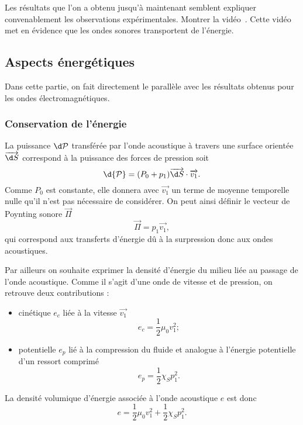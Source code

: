 \begin{transition}
Les résultats que l'on a obtenu jusqu'à maintenant semblent expliquer convenablement les observations expérimentales.
Montrer la vidéo~\cite{Metzdorff2017}.
Cette vidéo met en évidence que les ondes sonores transportent de l'énergie.
\end{transition}

\subsection{Aspects énergétiques}

Dans cette partie, on fait directement le parallèle avec les résultats obtenus pour les ondes électromagnétiques.

\subsubsection{Conservation de l'énergie}

La puissance $\d\cal{P}$ transférée par l'onde acoustique à travers une surface orientée $\overrightarrow{\d S}$ correspond à la puissance des forces de pression soit
\begin{equation*}
\d {\cal{P}} = (P_0+p_1) \overrightarrow{\d S} \cdot \overrightarrow{v_1}.
\end{equation*}
Comme $P_0$ est constante, elle donnera avec $\overrightarrow{v_1}$ un terme de moyenne temporelle nulle qu'il n'est pas nécessaire de considérer.
On peut ainsi définir le vecteur de Poynting sonore $\overrightarrow{\Pi}$
\begin{equation}
\overrightarrow{\Pi} = p_1\overrightarrow{v_1},
\end{equation}
qui correspond aux transferts d'énergie dû à la surpression donc aux ondes acoustiques.

Par ailleurs on souhaite exprimer la densité d'énergie du milieu liée au passage de l'onde acoustique.
Comme il s'agit d'une onde de vitesse et de pression, on retrouve deux contributions :
\begin{itemize}
\item cinétique $e_c$ liée à la vitesse $\overrightarrow{v_1}$
\begin{equation*}
e_c = \frac{1}{2}\mu_0 v_1^2 ;
\end{equation*}
\item potentielle $e_p$ lié à la compression du fluide et analogue à l'énergie potentielle d'un ressort comprimé
\begin{equation*}
e_p = \frac{1}{2} \chi_S p_1^2.
\end{equation*}
\end{itemize}
La densité volumique d'énergie associée à l'onde acoustique $e$ est donc
\begin{equation}
e = \frac{1}{2}\mu_0v_1^2 + \frac{1}{2}\chi_S p_1^2.
\end{equation}

